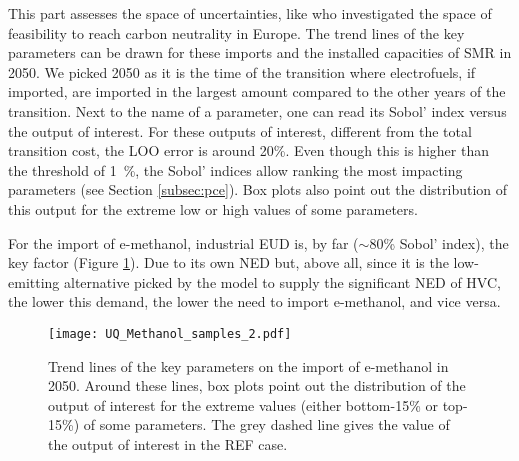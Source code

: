This part assesses the space of uncertainties, like \citet{pickering2022diversity} who investigated the space of feasibility to reach carbon neutrality in Europe. The trend lines of the key parameters can be drawn for these imports and the installed capacities of \gls{SMR} in 2050. We picked 2050 as it is the time of the transition where electrofuels, if imported, are imported in the largest amount compared to the other years of the transition. Next to the name of a parameter, one can read its Sobol' index versus the output of interest. For these outputs of interest, different from the total transition cost, the \gls{LOO} error is around 20\%. Even though this is higher than the threshold of \SI{1}{\%}, the Sobol' indices allow ranking the most impacting parameters (see Section \ref{subsec:pce}). Box plots also point out the distribution of this output for the extreme low or high values of some parameters.

For the import of e-methanol, industrial \gls{EUD} is, by far (\ie $\sim$80\% Sobol' index), the key factor (Figure \ref{fig:results_uq_samples_methanol}). Due to its own \gls{NED} but, above all, since it is the low-emitting alternative picked by the model to supply the significant \gls{NED} of \gls{HVC}, the lower this demand, the lower the need to import e-methanol, and vice versa. 

\begin{figure}[htbp!]
\centering
\texttt{[image: UQ\_Methanol\_samples\_2.pdf]}
\caption{Trend lines of the key parameters on the import of e-methanol in 2050. Around these lines, box plots point out the distribution of the output of interest for the extreme values (either bottom-15\% or top-15\%) of some parameters. The grey dashed line gives the value of the output of interest in the REF case. }
\label{fig:results_uq_samples_methanol}
\end{figure}

